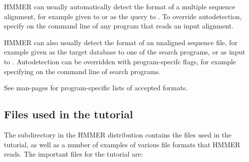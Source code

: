 HMMER can usually automatically detect the format of a multiple sequence
alignment, for example given to  or as the query to
. To override autodetection, specify  on the
command line of any program that reads an input alignment.

HMMER can also usually detect the format of an unaligned  
sequence file, for example given as the target database to one of the search
programs, or as input to . Autodetection can be overridden with
program-specifc flags, for example specifying  on
the command line of search programs.

See man-pages for program-specific lists of accepted formats. 

 

\subsection{Files used in the tutorial}

The subdirectory  in the HMMER distribution contains the
files used in the tutorial, as well as a number of examples of various
file formats that HMMER reads. The important files for the tutorial
are:

